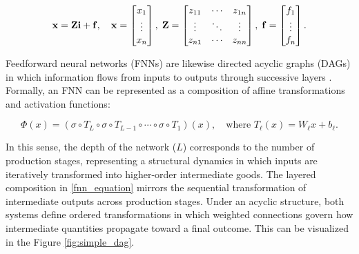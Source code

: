 \documentclass[preprint,12pt,authoryear]{sn-jnl}
\begin{document}
\begin{equation} \label{iom matrix}
\setlength{\abovedisplayskip}{5pt}
\setlength{\belowdisplayskip}{5pt}
\mathbf{x} = \mathbf{Z}\mathbf{i} + \mathbf{f}, \quad 
\mathbf{x} = 
\begin{bmatrix} x_1 \\ \vdots \\ x_n \end{bmatrix}, \;
\mathbf{Z} = 
\begin{bmatrix} z_{11} & \cdots & z_{1n} \\ \vdots & \ddots & \vdots \\ z_{n1} & \cdots & z_{nn} \end{bmatrix}, \;
\mathbf{f} = 
\begin{bmatrix} f_1 \\ \vdots \\ f_n \end{bmatrix}.
\end{equation}

Feedforward neural networks (FNNs) are likewise directed acyclic graphs (DAGs) in which information flows from inputs to outputs through successive layers \citep{sargent2024economic}. Formally, an FNN can be represented as a composition of affine transformations and activation functions:

\begin{equation} \label{fnn_equation}
\Phi(x) = (\sigma \circ T_L \circ \sigma \circ T_{L-1} \circ \cdots \circ \sigma \circ T_1)(x),
\quad \text{where } T_\ell(x) = W_\ell x + b_\ell.
\end{equation}

In this sense, the depth of the network ($L$) corresponds to the number of production stages, representing a structural dynamics in which inputs are iteratively transformed into higher-order intermediate goods. The layered composition in \eqref{fnn_equation} mirrors the sequential transformation of intermediate outputs across production stages. Under an acyclic structure, both systems define ordered transformations in which weighted connections govern how intermediate quantities propagate toward a final outcome. This can be visualized in the Figure \ref{fig:simple_dag}.
\end{document}
